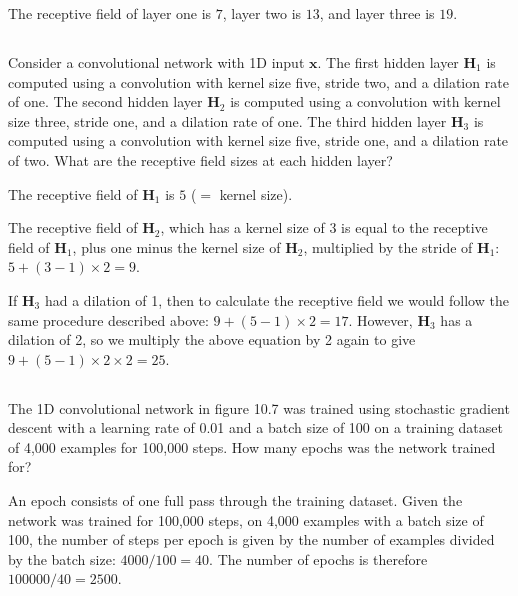 \documentclass[12pt]{report}
\begin{document}
The receptive field of layer one is $7$, layer two is $13$, and layer three is $19$.

\subsection{}
\begin{mdframed}
    Consider a convolutional network with 1D input $\mathbf{x}$. The first hidden layer $\mathbf{H}_{1}$ is computed using a convolution with kernel size five, stride two, and a dilation rate of one. The second hidden layer $\mathbf{H}_{2}$ is computed using a convolution with kernel size three, stride one, and a dilation rate of one. The third hidden layer $\mathbf{H}_{3}$ is computed using a convolution with kernel
    size five, stride one, and a dilation rate of two. What are the receptive field sizes at each hidden layer?
\end{mdframed}

The receptive field of $\mathbf{H}_{1}$ is $5$ ($=$ kernel size).

The receptive field of $\mathbf{H}_{2}$, which has a kernel size of 3 is equal to the receptive field of $\mathbf{H}_{1}$, plus one minus the kernel size of $\mathbf{H}_{2}$, multiplied by the stride of $\mathbf{H}_{1}$: $5 + (3-1) \times 2 = 9$.

If $\mathbf{H}_{3}$ had a dilation of 1, then to calculate the receptive field we would follow the same procedure described above: $9 + (5-1) \times 2 = 17$. However, $\mathbf{H}_{3}$ has a dilation of 2, so we multiply the above equation by 2 again to give $9 + (5-1) \times 2 \times 2 = 25$.


\subsection{}
\begin{mdframed}
    The 1D convolutional network in figure 10.7 was trained using stochastic gradient descent with a learning rate of 0.01 and a batch size of 100 on a training dataset of 4,000 examples for 100,000 steps. How many epochs was the network trained for?
\end{mdframed}

An epoch consists of one full pass through the training dataset. Given the network was trained for 100,000 steps, on 4,000 examples with a batch size of 100, the number of steps per epoch is given by the number of examples divided by the batch size: $4000/100 = 40$. The number of epochs is therefore $100000/40 = 2500$.
\end{document}
